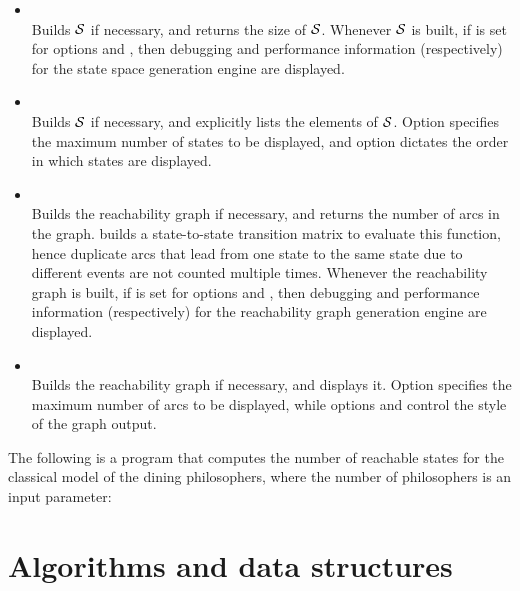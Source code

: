 \begin{itemize} 

\item
{}\\
Builds $\mathcal{S}$ if necessary, and returns the size of $\mathcal{S}$.
Whenever $\mathcal{S}$ is built,
if  is set for options  and ,
then debugging and performance information (respectively)
for the state space generation engine are displayed.

\item
{}\\
Builds $\mathcal{S}$ if necessary, and explicitly lists the elements of $\mathcal{S}$.
Option  specifies the maximum number of states
to be displayed,
and option  dictates the order in which states
are displayed.



\item
{}\\
Builds the reachability graph if necessary,
and returns the number of arcs in the graph.
{\smart} builds a state-to-state transition matrix to evaluate this function,
hence duplicate arcs that lead from one state to the same state
due to different events are not counted multiple times.
Whenever the reachability graph is built,
if  is set for options  and ,
then debugging and performance information (respectively)
for the reachability graph generation engine are displayed.

\item
{}\\
Builds the reachability graph if necessary,
and displays it.
Option  specifies the maximum number of arcs
to be displayed,
while options 
and  control the style of the graph output.
\end{itemize}

The following is a {\smart} program that computes the number of reachable states
for the classical model of the dining philosophers, where the number 
of philosophers is an input parameter:
%

%


\section{Algorithms and data structures}

